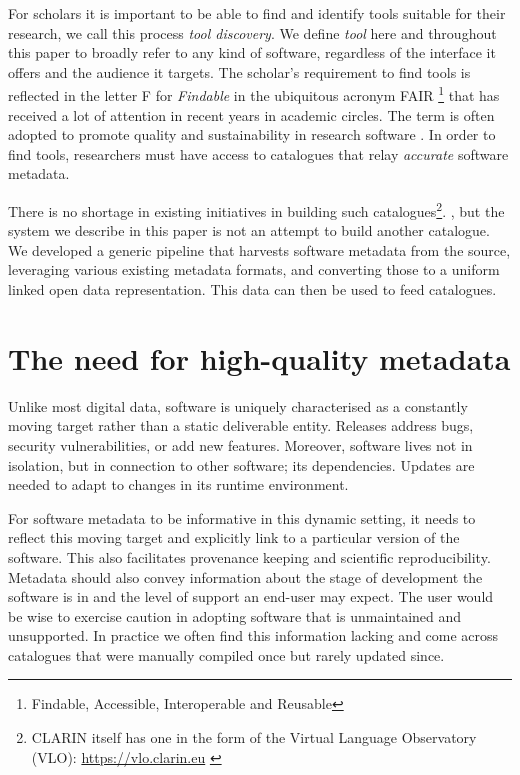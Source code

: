 \documentclass[a4paper,11pt]{article}
\begin{document}
For scholars it is important to be able to find and identify tools suitable for
their research, we call this process \emph{tool discovery}. We define
\emph{tool} here and throughout this paper to broadly refer to any kind of
software, regardless of the interface it offers and the audience it targets.
The scholar's requirement to find tools is reflected in the letter \textsc{F}
for \emph{Findable} in the ubiquitous acronym \textsc{FAIR} \footnote{Findable,
Accessible, Interoperable and Reusable} that has received a lot of attention in
recent years in academic circles. The term is often adopted to promote quality and
sustainability in research software \citep{FAIR}. In order to find tools,
researchers must have access to catalogues that relay \emph{accurate} software
metadata.

There is no shortage in existing initiatives in building such catalogues\footnote{CLARIN itself has one in the form of the Virtual Language Observatory (VLO): \url{https://vlo.clarin.eu} \citep{VLO}}.
, %
but the system we describe in this paper is not an attempt to build another catalogue.
We developed a generic pipeline that harvests software metadata from the source, leveraging
various existing metadata formats, and converting those to a uniform linked open data representation.
This data can then be used to feed catalogues.



\section{The need for high-quality metadata}

Unlike most digital data, software is uniquely characterised as a constantly
moving target rather than a static deliverable entity. Releases address bugs,
security vulnerabilities, or add new features. Moreover, software lives not in
isolation, but in connection to other software; its dependencies. Updates are
needed to adapt to changes in its runtime environment.

For software metadata to be informative in this dynamic setting, it needs to
reflect this moving target and explicitly link to a particular version of the
software. This also facilitates provenance keeping and scientific
reproducibility. Metadata should also convey information about the stage of
development the software is in and the level of support an end-user may expect.
The user would be wise to exercise caution in adopting software that is
unmaintained and unsupported. In practice we often find this information
lacking and come across catalogues that were manually compiled once but rarely
updated since.
\end{document}
